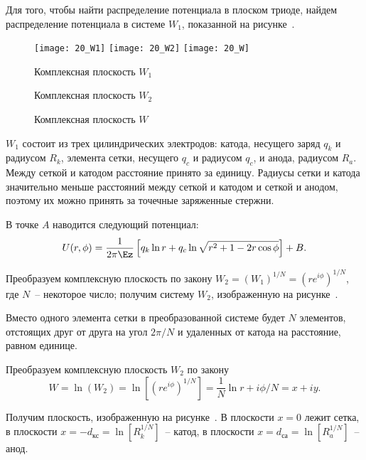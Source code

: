
Для того, чтобы найти распределение потенциала в плоском триоде, найдем
распределение потенциала в системе \( W_1 \), показанной на рисунке~.

\begin{figure}[h!]
  \center
  \texttt{[image: 20\_W1]} \hspace{1em}
  \texttt{[image: 20\_W2]} \hspace{1em}
  \texttt{[image: 20\_W]} \\
  \parbox{.3\textwidth}{\caption{Комплексная плоскость \( W_1 \)}
    \label{pic20W1}} \hspace{1em}
  \parbox{.3\textwidth}{\caption{Комплексная плоскость \( W_2 \)}
    \label{pic20W2}} \hspace{1em}
  \parbox{.3\textwidth}{\caption{Комплексная плоскость \( W \)}
    \label{pic20W}}
\end{figure}

\( W_1 \) состоит из трех цилиндрических электродов: катода, несущего заряд
\( q_k \) и радиусом \( R_k \), элемента сетки, несущего \( q_c \) и радиусом
\( q_c \), и анода, радиусом \( R_a \). Между сеткой и катодом расстояние
принято за единицу. Радиусы сетки и катода значительно меньше расстояний между
сеткой и катодом и сеткой и анодом, поэтому их можно принять за точечные
заряженные стержни.

В точке \( A \) наводится следующий потенциал:
\begin{equation}
  U(r, \phi) = \frac{1}{2\pi\Ez}\left[ q_k\ln r + q_c\ln\sqrt{r^2 + 1 -
    2r\cos\phi} \right] + B.
  \label{eqU1}
\end{equation}

Преобразуем комплексную плоскость по закону
\( W_2 = (W_1)^{1 / N} = (re^{i\phi})^{1 / N} \), где \( N \)~-- некоторое
число; получим систему \( W_2 \), изображенную на рисунке~.

Вместо одного элемента сетки в преобразованной системе будет \( N \) элементов,
отстоящих друг от друга на угол \( 2\pi / N \) и удаленных от катода на
расстояние, равном единице.

Преобразуем комплексную плоскость \( W_2 \) по закону
\[
  W = \ln(W_2) = \ln\left[ (re^{i\phi})^{1 / N} \right] = \frac{1}{N}\ln r +
    i\phi / N = x + iy.
\]

Получим плоскость, изображенную на рисунке~. В плоскости \( x = 0 \)
лежит сетка, в плоскости \( x = -d_\text{кс} = \ln\left[ R_k^{1 / N}
\right] \)~-- катод, в плоскости \( x = d_\text{са} =
\ln\left[ R_a^{1 / N} \right] \)~-- анод.

